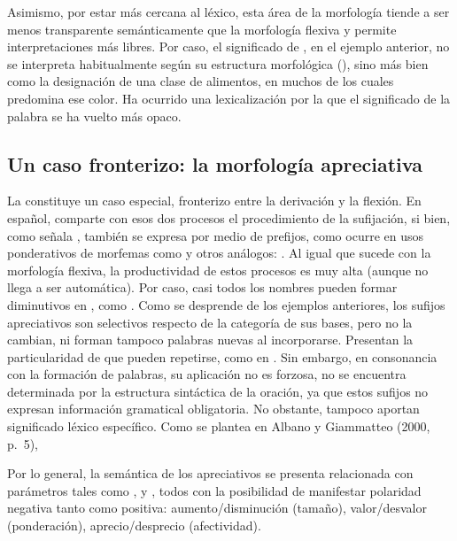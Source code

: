 Asimismo, por estar más cercana al léxico, esta área de la morfología tiende a
ser menos transparente semánticamente que la morfología flexiva y permite
interpretaciones más libres. Por caso, el significado de , en el
ejemplo anterior, no se interpreta habitualmente según su estructura
morfológica (), sino más bien como la designación de una
clase de alimentos, en muchos de los cuales predomina ese color. Ha ocurrido una
lexicalización por la que el significado de la palabra se ha vuelto más opaco.

\subsection{Un caso fronterizo: la morfología apreciativa}\label{sec:04-apreciativa}

La  constituye un caso especial, fronterizo entre
la derivación y la flexión. En español, comparte con esos dos procesos el
procedimiento de la sufijación, si bien, como señala \textcite{kornfeld2021},
también se expresa por medio de prefijos, como ocurre en usos ponderativos de
morfemas como  y otros análogos: . Al
igual que sucede con la morfología flexiva, la productividad de estos procesos
es muy alta (aunque no llega a ser automática). Por caso, casi todos los nombres
pueden formar diminutivos en , como . Como se desprende de los ejemplos anteriores, los sufijos
apreciativos son selectivos respecto de la categoría de sus bases, pero no la
cambian, ni forman tampoco palabras nuevas al incorporarse. Presentan la
particularidad de que pueden repetirse, como en . Sin
embargo, en consonancia con la formación de palabras, su aplicación no es
forzosa, no se encuentra determinada por la estructura sintáctica de la
oración, ya que estos sufijos no expresan información gramatical obligatoria. No
obstante, tampoco aportan significado léxico específico. Como se plantea en
Albano y Giammatteo (2000, p.~5),

\begin{cita}
Por lo general, la semántica de los apreciativos se presenta relacionada con
parámetros tales como ,  y ,
todos con la posibilidad de manifestar polaridad negativa tanto como positiva:
aumento/disminución (tamaño), valor/desvalor (ponderación), aprecio/desprecio
(afectividad).
\end{cita}

